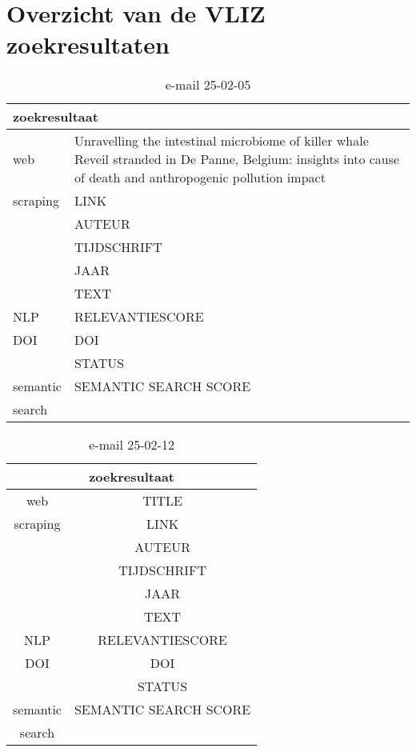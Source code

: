 \section{Overzicht van de VLIZ zoekresultaten}
\begin{table}[h!]
    \caption{e-mail 25-02-05}
    \centering
    \begin{tabularx}{\textwidth}{|p{4cm}|X|} 
        \hline
        \multicolumn{2}{|X|}{\textbf{zoekresultaat}} \\
        \hline
        web &Unravelling the intestinal microbiome of killer whale Reveil stranded in De Panne, Belgium: insights into cause of death and anthropogenic pollution impact\\
        scraping&LINK\\
        &AUTEUR\\
        &TIJDSCHRIFT\\
        &JAAR\\
        &TEXT\\
        \hline
        NLP&RELEVANTIESCORE\\
        \hline
        DOI&DOI\\
        &STATUS\\
        \hline
        semantic&SEMANTIC SEARCH SCORE\\
        search&\\
        \hline
    \end{tabularx}
    \label{table:email20250205}
\end{table}
\begin{table}[h!]
    \caption{e-mail 25-02-12}
    \centering
    \begin{tabular}{|c|c|} 
        \hline
        \multicolumn{2}{|c|}{\textbf{zoekresultaat}} \\
        \hline
        web &TITLE\\
        scraping&LINK\\
        &AUTEUR\\
        &TIJDSCHRIFT\\
        &JAAR\\
        &TEXT\\
        \hline
        NLP&RELEVANTIESCORE\\
        \hline
        DOI&DOI\\
        &STATUS\\
        \hline
        semantic&SEMANTIC SEARCH SCORE\\
        search&\\
        \hline
    \end{tabular}
    \label{table:email20250212}
\end{table}
